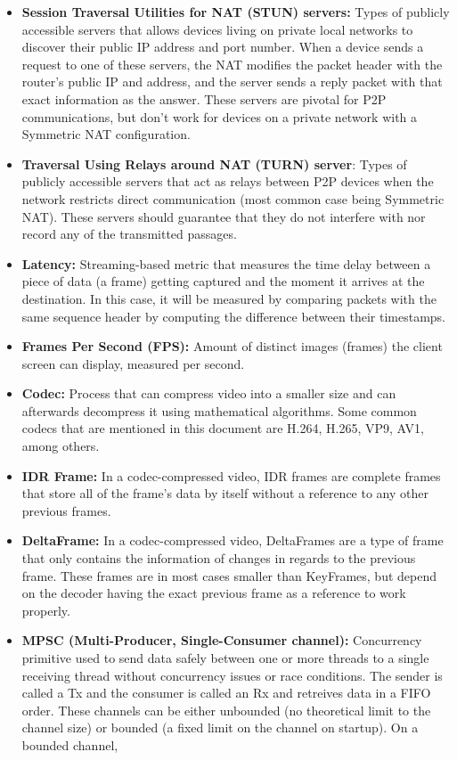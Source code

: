 \documentclass{article}
\begin{document}
\begin{itemize}
    incoming traffic from external devices and thus turns Hole Punching useless.
    \item \textbf{Session Traversal Utilities for NAT (STUN) servers:} Types of publicly accessible servers that allows devices living on private local networks to discover their public IP address and port number. When a device sends a request to one of these servers, the NAT modifies the packet header with the router's public IP and address, and the server sends a reply packet with that exact information as the answer. 
    These servers are pivotal for P2P communications, but don't work for devices on a private network with a Symmetric NAT configuration.  
    \item \textbf{Traversal Using Relays around NAT (TURN) server}: Types of publicly accessible servers that act as relays between P2P devices when the network restricts direct communication (most common case being Symmetric NAT). These servers should guarantee that they do not interfere with nor record any of the transmitted passages.
    \item \textbf{Latency:} Streaming-based metric that measures the time delay between a piece of data (a frame) getting captured and the moment it arrives at the destination. In this case, it will be measured by comparing packets with the same sequence header by computing the difference between their timestamps.
    \item \textbf{Frames Per Second (FPS):} Amount of distinct images (frames) the client screen can display, measured per second.
    \item \textbf{Codec:} Process that can compress video into a smaller size and can afterwards decompress it using mathematical algorithms. Some common codecs that are mentioned in this document are H.264, H.265, VP9, AV1, among others.  
    \item \textbf{IDR Frame:} In a codec-compressed video, IDR frames are complete frames that store all of the frame's data by itself without a reference to any other previous frames. 
    \item \textbf{DeltaFrame:} In a codec-compressed video, DeltaFrames are a type of frame that only contains the information of changes in regards to the previous frame. These frames are in most cases smaller than KeyFrames, but depend on the decoder having the exact previous frame as a reference to work properly.
    \item \textbf{MPSC (Multi-Producer, Single-Consumer channel): }Concurrency primitive used to send data safely between one or more threads to a single receiving thread without concurrency issues or race conditions. The sender is called a Tx and the consumer is called an Rx and retreives data in a FIFO order. These channels can be either unbounded (no theoretical limit to the channel size) or bounded (a fixed limit on the channel on startup). On a bounded channel, 

\end{itemize}
\end{document}
